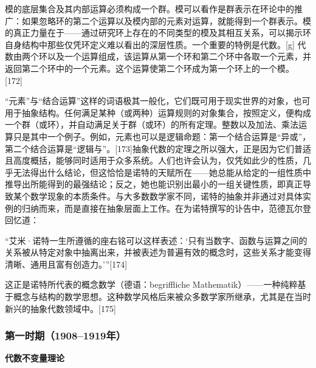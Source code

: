 模的底层集合及其内部运算必须构成一个群。模可以看作是群表示在环论中的推广：如果忽略环的第二个运算以及模内部的元素对运算，就能得到一个群表示。模的真正力量在于——通过研究环上存在的不同类型的模及其相互关系，可以揭示环自身结构中那些仅凭环定义难以看出的深层性质。一个重要的特例是代数。[g] 代数由两个环以及一个运算组成，该运算从第一个环和第二个环中各取一个元素，并返回第二个环中的一个元素。这个运算使第二个环成为第一个环上的一个模。[172]

“元素”与“结合运算”这样的词语极其一般化，它们既可用于现实世界的对象，也可用于抽象结构。任何满足某种（或两种）运算规则的对象集合，按照定义，便构成一个群（或环），并自动满足关于群（或环）的所有定理。整数以及加法、乘法运算只是其中一个例子。例如，元素也可以是逻辑命题：第一个结合运算是“异或”，第二个结合运算是“逻辑与”。[173]抽象代数的定理之所以强大，正是因为它们普适且高度概括，能够同时适用于众多系统。人们也许会认为，仅凭如此少的性质，几乎无法得出什么结论，但这恰恰是诺特的天赋所在——她总能从给定的一组性质中推导出所能得到的最强结论；反之，她也能识别出最小的一组关键性质，即真正导致某个数学现象的本质条件。与大多数数学家不同，诺特的抽象并非通过对具体实例的归纳而来，而是直接在抽象层面上工作。在为诺特撰写的讣告中，范德瓦尔登回忆道：

“艾米·诺特一生所遵循的座右铭可以这样表述：‘只有当数字、函数与运算之间的关系被从特定对象中抽离出来，并被表述为普遍有效的概念时，这些关系才能变得清晰、通用且富有创造力。’”[174]

这正是诺特所代表的概念数学（德语：begriffliche Mathematik）——一种纯粹基于概念与结构的数学思想。这种数学风格后来被众多数学家所继承，尤其是在当时新兴的抽象代数领域中。[175]
\subsubsection{第一时期（1908–1919年）}
\textbf{代数不变量理论}